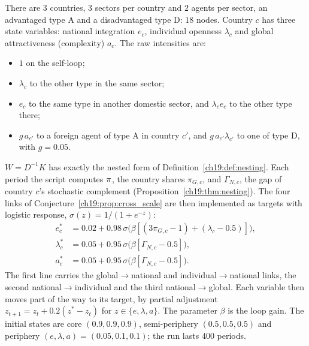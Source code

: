 \documentclass[../solutions_manual.tex]{subfiles}
\begin{document}

 There are $3$ countries, $3$ sectors per country and $2$ agents per sector, an advantaged type A and a disadvantaged type D: $18$ nodes. Country $c$ has three state variables: national integration $e_c$, individual openness $\lambda_c$ and global attractiveness (complexity) $a_c$. The raw intensities are:
\begin{itemize}
\item $1$ on the self-loop;
\item $\lambda_c$ to the other type in the same sector;
\item $e_c$ to the same type in another domestic sector, and $\lambda_c e_c$ to the other type there;
\item $g\,a_{c'}$ to a foreign agent of type A in country $c'$, and $g\,a_{c'}\lambda_{c'}$ to one of type D, with $g = 0.05$.
\end{itemize}
$W = D^{-1}K$ has exactly the nested form of Definition~\ref{ch19:def:nesting}. Each period the script computes $\pi$, the country shares $\pi_{G,c}$, and $\Gamma_{N,c}$, the gap of country $c$'s stochastic complement (Proposition~\ref{ch19:thm:nesting}). The four links of Conjecture~\ref{ch19:prop:cross_scale} are then implemented as targets with logistic response, $\sigma(z) = 1/(1+e^{-z})$:
\begin{align*}
e_c^* &= 0.02 + 0.98\,\sigma\big(\beta[(3\pi_{G,c} - 1) + (\lambda_c - 0.5)]\big),\\
\lambda_c^* &= 0.05 + 0.95\,\sigma\big(\beta[\Gamma_{N,c} - 0.5]\big),\\
a_c^* &= 0.05 + 0.95\,\sigma\big(\beta[\Gamma_{N,c} - 0.5]\big).
\end{align*}
The first line carries the global$\to$national and individual$\to$national links, the second national$\to$individual and the third national$\to$global. Each variable then moves part of the way to its target, by partial adjustment $z_{t+1} = z_t + 0.2(z^* - z_t)$ for $z \in \{e, \lambda, a\}$. The parameter $\beta$ is the loop gain. The initial states are core $(0.9, 0.9, 0.9)$, semi-periphery $(0.5, 0.5, 0.5)$ and periphery $(e, \lambda, a) = (0.05, 0.1, 0.1)$; the run lasts 400 periods.
\end{document}

